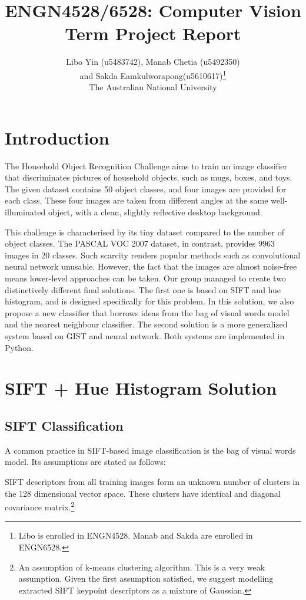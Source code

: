 \documentclass[11pt,a4paper]{article}
\begin{document}
\title{ENGN4528/6528: Computer Vision\\Term Project Report}
\author{Libo Yin (u5483742), Manab Chetia (u5492350)\\and Sakda Eamkulworapong(u5610617)\footnote{Libo is enrolled in ENGN4528. Manab and Sakda are enrolled in ENGN6528.}\\The Australian National University}
\maketitle

\section{Introduction}
\label{sec:intro}
The Household Object Recognition Challenge aims to train an image classifier that discriminates pictures of household objects, such as mugs, boxes, and toys. The given dataset contains 50 object classes, and four images are provided for each class. These four images are taken from different angles at the same well-illuminated object, with a clean, slightly reflective desktop background.

This challenge is characterised by its tiny dataset compared to the number of object classes. The PASCAL VOC 2007 dataset\cite{everingham2010pascal}, in contrast, provides 9963 images in 20 classes. Such scarcity renders popular methods such as convolutional neural network unusable. However, the fact that the images are almost noise-free means lower-level approaches can be taken. Our group managed to create two distinctively different final solutions. The first one is based on SIFT and hue histogram, and is designed specifically for this problem. In this solution, we also propose a new classifier that borrows ideas from the bag of visual words model and the nearest neighbour classifier. The second solution is a more generalized system based on GIST and neural network. Both systems are implemented in Python.

\section{SIFT + Hue Histogram Solution}
\subsection{SIFT Classification}
\label{sec:hist}

A common practice in SIFT-based image classification is the bag of visual words model. Its assumptions are stated as follows:
\begin{displayquote}
SIFT descriptors from all training images form an unknown number of clusters in the 128 dimensional vector space. These clusters have identical and diagonal covariance matrix.\footnote{An assumption of k-means clustering algorithm\cite{numrecipes3}. This is a very weak assumption. Given the first assumption satisfied, we suggest modelling extracted SIFT keypoint descriptors as a mixture of Gaussian.}
\end{displayquote}
\end{document}
